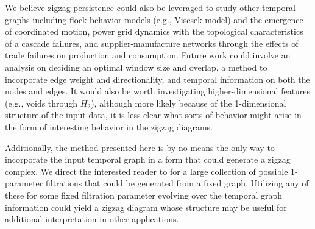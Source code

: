 We believe zigzag persistence could also be leveraged to study other temporal graphs including flock behavior models (e.g., Viscsek model) and the emergence of coordinated motion, power grid dynamics with the topological characteristics of a cascade failures, and supplier-manufacture networks through the effects of trade failures on production and consumption.
Future work could involve an analysis on deciding an optimal window size and overlap, a method to incorporate edge weight and directionality, and temporal information on both the nodes and edges. 
It would also be worth investigating higher-dimensional features (e.g., voids through $H_2$), although more likely because of the 1-dimensional structure of the input data, it is less clear what sorts of behavior might arise in the form of interesting behavior in the zigzag diagrams.

Additionally, the method presented here is by no means the only way to incorporate the input temporal graph in a form that could generate a zigzag complex. 
We direct the interested reader to \cite{Aktas2019} for a large collection of possible 1-parameter filtrations that could be generated from a fixed graph. 
Utilizing any of these for some fixed filtration parameter evolving over the temporal graph information could yield a zigzag diagram whose structure may be useful for additional interpretation in other applications. 


